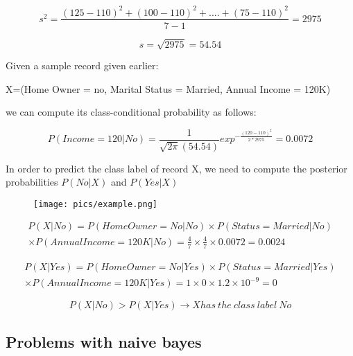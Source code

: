 				\begin{equation}
					s^{2} = \frac{(125-110)^{2} + (100-110)^{2} + .... + (75-110)^{2}}{7-1} = 2975
				\end{equation}

				\begin{equation}
					s = \sqrt{2975} = 54.54
				\end{equation}

				Given a sample record given earlier:

				X=(Home Owner = no, Marital Status = Married, Annual Income = 120K)

				we can compute its class-conditional probability as follows:

				\begin{equation}
					P(Income = 120|No) = \frac{1}{\sqrt{2\pi}(54.54)}
					exp^{-\frac{(120-110)^{2}}{2*2975}} = 0.0072
				\end{equation}

				In order to predict the class label of record X, we need to compute the 
				posterior probabilities $P(No|X)$ and $P(Yes|X)$

				\begin{figure}[H]
					\texttt{[image: pics/example.png]}
				\end{figure}

				\begin{equation}
				\begin{split}
					P(X|No) = P(Home Owner = No|No) \times P(Status = Married|No) \\
					\times P(Annual Income = 120K|No)
					= \frac{4}{7} \times \frac{4}{7} \times 0.0072 = 0.0024
				\end{split}
				\end{equation}

				\begin{equation}
				\begin{split}
					P(X|Yes) = P(Home Owner = No|Yes) \times P(Status = Married|Yes) \\
					\times P(Annual Income = 120K|Yes)
					= 1 \times 0 \times 1.2 \times 10^{-9} = 0
				\end{split}
				\end{equation}

				\begin{equation}
					P(X|No) > P(X|Yes) \rightarrow X has\:the\:class\:label\:No
				\end{equation}

		\subsection{Problems with naive bayes}

